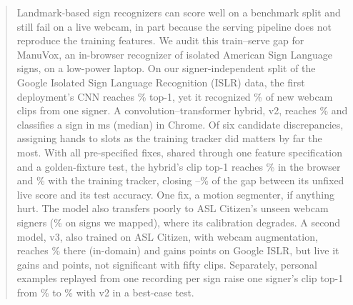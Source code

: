 \begin{abstract}
Landmark-based sign recognizers can score well on a benchmark split and still fail on a live
webcam, in part because the serving pipeline does not reproduce the training features. We audit
this train--serve gap for ManuVox, an in-browser recognizer of  isolated American
Sign Language signs, on a low-power laptop. On our signer-independent split of the Google Isolated
Sign Language Recognition (ISLR) data, the first deployment's CNN reaches \% top-1,
yet it recognized \% of  new webcam clips from one signer.
A convolution--transformer hybrid, v2, reaches \% and classifies a sign in
 ms (median) in Chrome. Of six candidate discrepancies, assigning hands to slots as
the training tracker did matters by far the most. With all pre-specified fixes, shared through one
feature specification and a golden-fixture test, the hybrid's clip top-1 reaches
\% in the browser and \% with the training tracker,
closing --\% of the gap between its unfixed live score and its
test accuracy. One fix, a motion segmenter, if anything hurt. The model also transfers poorly to
ASL Citizen's unseen webcam signers (\% on  signs we mapped), where its
calibration degrades. A second model, v3, also trained on ASL Citizen, with webcam augmentation,
reaches \% there (in-domain) and gains  points
on Google ISLR, but live it gains  and  points, not significant with
fifty clips. Separately, personal examples replayed from one recording per sign raise one signer's
clip top-1 from \% to \% with v2 in a best-case test.
\end{abstract}
